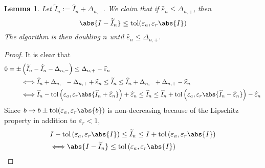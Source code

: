 \documentclass[]{elsarticle}
\newtheorem{lem}{Lemma}
\theoremstyle{definition}
\newcommand{\tol}{\text{tol}}
\begin{document}
\begin{lem}
Let $\widetilde{I}_n:=\widehat{I}_n+\Delta_{n,-}$. We claim that if $\widehat{\varepsilon}_n\leq \Delta_{n,+}$, then
\[
\abs{I-\widetilde{I}_n}\leq \tol(\varepsilon_a,\varepsilon_r\abs{I})
\]
The algorithm is then doubling $n$ until $\widehat{\varepsilon}_n\leq \Delta_{n,+}$.
\end{lem}
\begin{proof}
It is clear that
\begin{align*}
0=\pm&\left(\widetilde{I}_n-\widehat{I}_n-\Delta_{n,-}\right)\leq \Delta_{n,+}-\widehat{\varepsilon}_n \\
&\Longleftrightarrow \widehat{I}_n+\Delta_{n,-} - \Delta_{n,+}+\widehat{\varepsilon}_n\leq \widetilde{I}_n \leq \widehat{I}_n+\Delta_{n,-}+ \Delta_{n,+}-\widehat{\varepsilon}_n\\
&\Longleftrightarrow \widehat{I}_n-\tol\left(\varepsilon_a,\varepsilon_r\abs{\widehat{I}_n+\widehat{\varepsilon}_n}\right)+\widehat{\varepsilon}_n\leq \widetilde{I}_n \leq \widehat{I}_n+\tol\left(\varepsilon_a,\varepsilon_r\abs{\widehat{I}_n-\widehat{\varepsilon}_n}\right)-\widehat{\varepsilon}_n
\end{align*}
Since $b\rightarrow b\pm \tol(\varepsilon_a,\varepsilon_r\abs{b})$ is non-decreasing because of the Lipschitz property in addition to $\varepsilon_r<1$,
\begin{align*}
&I-\tol\left(\varepsilon_a,\varepsilon_r\abs{I}\right)\leq \widetilde{I}_n  \leq I+\tol\left(\varepsilon_a,\varepsilon_r\abs{I}\right)\\
&\Longleftrightarrow \abs{I-\widetilde{I}_n}\leq\tol\left(\varepsilon_a,\varepsilon_r\abs{I}\right)
\end{align*}
\end{proof}
\end{document}
